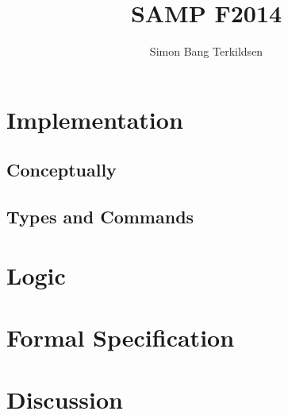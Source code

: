 \documentclass[citeauthoryear]{llncs} %
\title{SAMP F2014}
\author{Simon Bang Terkildsen}
\institute{IT University of Copenhagen}
\begin{document}
\maketitle

\begin{abstract}

\end{abstract}



\section{Implementation}

\subsection{Conceptually}




\subsection{Types and Commands}





\section{Logic}


\section{Formal Specification}



\section{Discussion}






\end{document}
